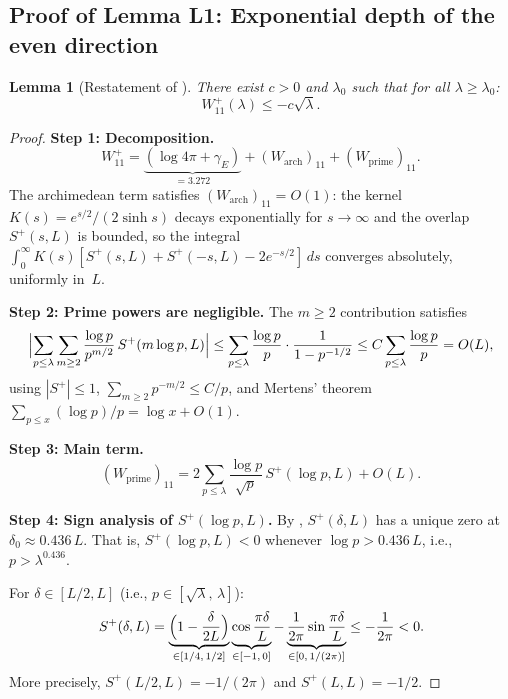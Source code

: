 \documentclass[12pt,a4paper]{article}
\newtheorem{lemma}[theorem]{Lemma}
\theoremstyle{definition}
\theoremstyle{remark}
\begin{document}
\subsection{Proof of Lemma L1: Exponential depth of the even direction}

\begin{lemma}[Restatement of ]
There exist $c > 0$ and $\lambda_0$ such that for all $\lambda \geq \lambda_0$:
\[
  W_{11}^+(\lambda) \leq -c\sqrt{\lambda}.
\]
\end{lemma}

\begin{proof}
\textbf{Step 1: Decomposition.}
\[
  W_{11}^+ = \underbrace{(\log 4\pi + \gamma_E)}_{= 3.272} + (W_{\mathrm{arch}})_{11} + (W_{\mathrm{prime}})_{11}.
\]
The archimedean term satisfies $(W_{\mathrm{arch}})_{11} = O(1)$: the kernel $K(s) = e^{s/2}/(2\sinh s)$ decays exponentially for $s \to \infty$ and the overlap $S^+(s, L)$ is bounded, so the integral $\int_0^{\infty} K(s)[S^+(s,L) + S^+(-s,L) - 2e^{-s/2}]\,ds$ converges absolutely, uniformly in~$L$.

\medskip\noindent\textbf{Step 2: Prime powers are negligible.}
The $m \geq 2$ contribution satisfies
\[
  \Bigl|\sum_{p \leq \lambda}\sum_{m \geq 2} \frac{\log p}{p^{m/2}}\,S^+(m\log p, L)\Bigr|
  \leq \sum_{p \leq \lambda} \frac{\log p}{p}\cdot\frac{1}{1 - p^{-1/2}}
  \leq C\sum_{p \leq \lambda}\frac{\log p}{p} = O(L),
\]
using $|S^+| \leq 1$, $\sum_{m \geq 2} p^{-m/2} \leq C/p$, and Mertens' theorem $\sum_{p \leq x} (\log p)/p = \log x + O(1)$.

\medskip\noindent\textbf{Step 3: Main term.}
\begin{equation}
\label{eq:main-term}
  (W_{\mathrm{prime}})_{11} = 2\sum_{p \leq \lambda}\frac{\log p}{\sqrt{p}}\,S^+(\log p, L) + O(L).
\end{equation}

\medskip\noindent\textbf{Step 4: Sign analysis of $S^+(\log p, L)$.}
By , $S^+(\delta, L)$ has a unique zero at $\delta_0 \approx 0.436\,L$. That is, $S^+(\log p, L) < 0$ whenever $\log p > 0.436\,L$, i.e., $p > \lambda^{0.436}$.

For $\delta \in [L/2, L]$ (i.e., $p \in [\sqrt{\lambda},\,\lambda]$):
\[
  S^+(\delta, L) = \underbrace{\Bigl(1 - \frac{\delta}{2L}\Bigr)}_{\in [1/4,\,1/2]}
  \underbrace{\cos\frac{\pi\delta}{L}}_{\in [-1,\,0]}
  - \underbrace{\frac{1}{2\pi}\sin\frac{\pi\delta}{L}}_{\in [0,\,1/(2\pi)]}
  \leq -\frac{1}{2\pi} < 0.
\]
More precisely, $S^+(L/2, L) = -1/(2\pi)$ and $S^+(L, L) = -1/2$.


\end{proof}
\end{document}
